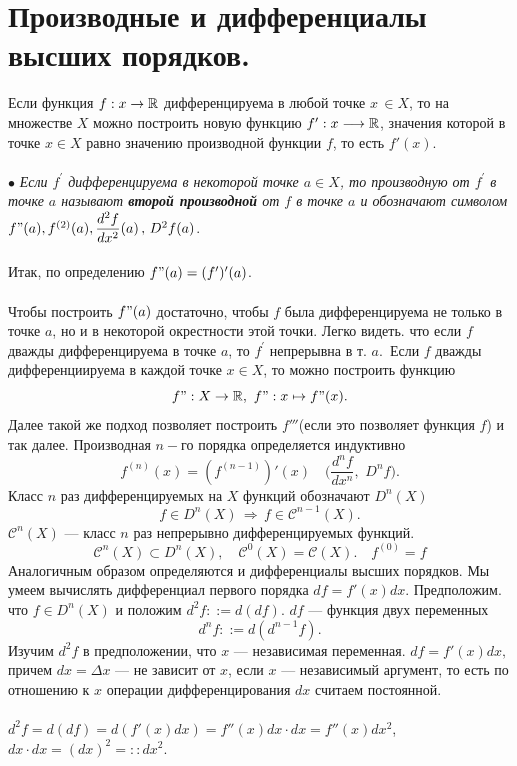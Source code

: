 \section{Производные и дифференциалы высших порядков.}
Если функция $f : x \rightarrow \mathbb{R}$ дифференцируема в любой точке $x \, \in X$, то на множестве $X$ можно построить новую функцию $f' : x \longrightarrow \mathbb{R}$, значения которой в точке $x \in X$ равно значению производной функции $f$, то есть $f'(x)$.\\\\
$\bullet$ \textit{Если $f^\prime$ дифференцируема в некоторой точке $a \in X$, то производную от $f^\prime$ в точке $a$ называют \textbf{второй производной} от $f$ в точке $a$ и обозначают символом $f"(a), f^{(2)}(a), \dfrac{d^2f}{d x^2}(a) \, , \, D^2f(a)$}.\\\\
Итак, по определению $f"(a)=(f')'(a)$.\\\\
Чтобы построить $f"(a)$ достаточно, чтобы $f$ была дифференцируема не только в точке $a$, но и в некоторой окрестности этой точки.
Легко видеть. что если $f$ дважды дифференцируема в точке $a$, то $f^\prime$ непрерывна в т. $a$.\
Если $f$ дважды дифференциируема в каждой точке $x \in X$, то можно построить функцию
$$f" : X \rightarrow \mathbb{R}, \, \, f" : x \mapsto f"(x).$$
Далее такой же подход позволяет построить $f'''$(если это позволяет функция $f$) и так далее.
Производная $n-$го порядка определяется индуктивно
$$f^{(n)}(x)=(f^{(n-1)})'(x) \quad \Big( \frac{d^n f}{d x^n}, \, \, D^n  f\Big).$$
Класс $n$ раз дифференцируемых на $X$ функций обозначают $D^n (X)$
$$f \in D^n(X) \, \Longrightarrow \, f \in \mathcal{C}^{n-1}(X).$$
$\mathcal{C}^n(X)$ --- класс $n$ раз непрерывно дифференцируемых функций.
$$\mathcal{C}^n(X) \subset D^n(X), \quad \mathcal{C}^0(X)=\mathcal{C}(X).\quad f^{(0)}=f$$
Аналогичным образом определяются и дифференциалы высших порядков. Мы умеем вычислять дифференциал первого порядка
$df=f'(x)dx.$ Предположим. что $f \in D^n(X)$ и положим $d^2f ::=d(d f)$.
$df$ --- функция двух переменных
$$d^n f ::=d(d^{n-1} f).$$
Изучим $d^2f$ в предположении, что $x$ --- независимая переменная. $df=f'(x)dx,$ причем $dx= \Delta x$ --- не зависит от $x$, если $x$ --- независимый аргумент, то есть по отношению к $x$ операции дифференцирования $dx$ считаем постоянной.\\\\
$d^2f=d(df)=d(f'(x)dx)=f''(x)dx \cdot dx =f''(x) d x^2$,\\
$dx \cdot dx=(dx)^2= :: d x^2$.\\\\
